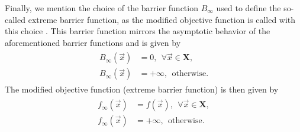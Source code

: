 Finally, we mention the choice of the barrier function $ B_{\infty} $ used to define the so-called extreme barrier function, as the modified objective function is called with this choice \cite{BBO-textbook}. This barrier function mirrors the asymptotic behavior of the aforementioned barrier functions and is given by
\begin{align}
	\begin{split}
		B_{\infty}(\vec{x}) &= 0, \ \ \forall \vec{x} \in \mathbf{X},\\[6pt]
		B_{\infty}(\vec{x}) &= +\infty, \ \ \text{otherwise.}
	\end{split}
\end{align}
The modified objective function (extreme barrier function) is then given by
\begin{align}\label{eq:extreme barrier}
	\begin{split}
		f_{\infty}(\vec{x}) &= f(\vec{x}) , \ \ \forall \vec{x} \in \mathbf{X},\\[6pt]
		f_{\infty}(\vec{x}) &= +\infty, \ \ \text{otherwise.}
	\end{split}
\end{align}